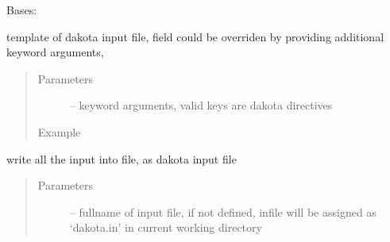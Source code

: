 \documentclass[letterpaper,10pt,english]{sphinxmanual}
\begin{document}
\begin{fulllineitems}
\label{\detokenize{src/apidocs/genopt:genopt.DakotaInput}}
Bases: \href{https://docs.python.org/2/library/functions.html\#object}{}

template of dakota input file, field could be overriden by
providing additional keyword arguments,
\begin{quote}\begin{description}
\item[{Parameters}] \leavevmode
{} -- keyword arguments, valid keys are dakota directives

\item[{Example}] \leavevmode
\end{description}\end{quote}

\begin{sphinxVerbatim}[commandchars=\\\{\},formatcom=\scriptsize]
  \PYG{p}{[}
\PYG{g+go}{                                  \PYGZdq{}conmin\PYGZus{}frcg\PYGZdq{},])}
\end{sphinxVerbatim}

\begin{fulllineitems}
\label{\detokenize{src/apidocs/genopt:genopt.DakotaInput.set_template}}
\end{fulllineitems}


\begin{fulllineitems}
\label{\detokenize{src/apidocs/genopt:genopt.DakotaInput.write}}
write all the input into file, as dakota input file
\begin{quote}\begin{description}
\item[{Parameters}] \leavevmode
{} -- fullname of input file, if not defined, infile will
be assigned as `dakota.in' in current working directory

\end{description}\end{quote}

\end{fulllineitems}


\end{fulllineitems}
\end{document}
